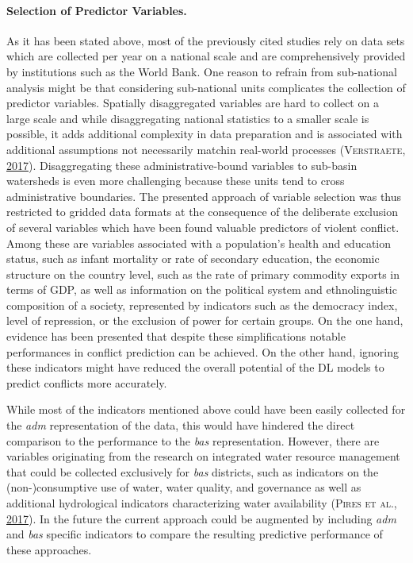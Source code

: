 \documentclass[a4paper,11pt]{article}
\begin{document}
\hypertarget{selection-of-predictor-variables.}{%
\paragraph{Selection of Predictor Variables.}\label{selection-of-predictor-variables.}}

As it has been stated above, most of the previously cited studies rely on data
sets which are collected per year on a national scale and are comprehensively
provided by institutions such as the World Bank. One reason to refrain from sub-national
analysis might be that considering sub-national units complicates the
collection of predictor variables. Spatially disaggregated variables are hard to
collect on a large scale and while disaggregating national statistics to a smaller
scale is possible, it adds additional complexity in data preparation and is
associated with additional assumptions not necessarily matchin real-world processes \textsc{(\textnormal{\textsc{Verstraete}}, \textnormal{\protect\hyperlink{ref-verstraete2017}{2017}})}.
Disaggregating these administrative-bound variables to sub-basin watersheds is
even more challenging because these units tend to cross administrative boundaries.
The presented approach of variable selection was thus restricted to gridded data
formats at the consequence of the deliberate exclusion of several variables which
have been found valuable predictors of violent conflict. Among these are variables
associated with a population's health and education status, such as infant mortality
or rate of secondary education, the economic structure on the country level, such
as the rate of primary commodity exports in terms of GDP, as well as information
on the political system and ethnolinguistic composition of a society, represented
by indicators such as the democracy index, level of repression, or the exclusion
of power for certain groups. On the one hand, evidence has been presented that
despite these simplifications notable performances in conflict prediction can be
achieved. On the other hand, ignoring these indicators might have reduced the
overall potential of the DL models to predict conflicts more accurately.

While most of the indicators mentioned above could have been easily collected for
the \emph{adm} representation of the data, this would have hindered the direct comparison
to the performance to the \emph{bas} representation. However, there are variables
originating from the research on integrated water resource management that could
be collected exclusively for \emph{bas} districts, such as indicators on the (non-)consumptive
use of water, water quality, and governance as well as additional hydrological
indicators characterizing water availability \textsc{(\textnormal{\textsc{Pires} \textsc{et al.}}, \textnormal{\protect\hyperlink{ref-pires2017}{2017}})}. In the future the
current approach could be augmented by including \emph{adm} and \emph{bas} specific
indicators to compare the resulting predictive performance of these approaches.
\end{document}
